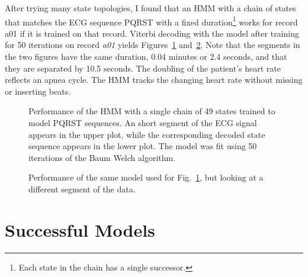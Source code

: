 \documentclass[12pt]{article}
\begin{document}
After trying many state topologies, I found that an HMM with a chain
of states that matches the ECG sequence PQRST with a fixed
duration\footnote{Each state in the chain has a single successor.}
works for record a01 if it is trained on that record.  Viterbi
decoding with the model after training for 50 iterations on record
\emph{a01} yields Figures~\ref{fig:dict_states_70}
and~\ref{fig:dict_states_71}.  Note that the segments in the two
figures have the same duration, 0.04 minutes or 2.4 seconds, and that
they are separated by 10.5 seconds.  The doubling of the patient's
heart rate reflects an apnea cycle.  The HMM tracks the changing heart
rate without missing or inserting beats.

\begin{figure}
  \centering
    \caption{Performance of the HMM with a single chain of 49 states
      trained to model PQRST sequences.  An short segment of the ECG
      signal appears in the upper plot, while the corresponding
      decoded state sequence appears in the lower plot.  The model was
      fit using 50 iterations of the Baum Welch algorithm.}
  \label{fig:dict_states_70}
\end{figure}

\begin{figure}
  \centering
  \caption{Performance of the same model used for
    Fig.~\ref{fig:dict_states_70}, but looking at a different
    segment of the data.}
  \label{fig:dict_states_71}
\end{figure}

\section{Successful Models}
\label{sec:successful_models}
\end{document}

